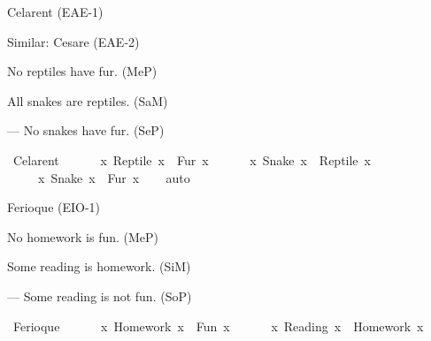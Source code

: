 \begin{isabellebody}
\begin{exercise}[subtitle=Silogizmi]
\begin{isamarkuptext}
Celarent (EAE-1)%
\end{isamarkuptext}\isamarkuptrue%
%
\begin{isamarkuptext}%
Similar: Cesare (EAE-2)%
\end{isamarkuptext}\isamarkuptrue%
%
\begin{isamarkuptext}%
No reptiles have fur. (MeP)%
\end{isamarkuptext}\isamarkuptrue%
%
\begin{isamarkuptext}%
All snakes are reptiles. (SaM)%
\end{isamarkuptext}\isamarkuptrue%
%
\begin{isamarkuptext}%
— No snakes have fur. (SeP)%
\end{isamarkuptext}\isamarkuptrue%
\isamarkupfalse%
\ Celarent{\isacharcolon}{\kern0pt}\ {\isachardoublequoteopen}\isanewline
\ \ \ \ {\isacharparenleft}{\kern0pt}{\isasymnexists}\ x{\isachardot}{\kern0pt}\ Reptile\ x\ {\isasymand}\ Fur\ x{\isacharparenright}{\kern0pt}\ {\isasymand}\isanewline
\ \ \ \ {\isacharparenleft}{\kern0pt}{\isasymforall}\ x{\isachardot}{\kern0pt}\ Snake\ x\ {\isasymlongrightarrow}\ Reptile\ x{\isacharparenright}{\kern0pt}\ {\isasymlongrightarrow}\isanewline
\ \ \ \ {\isacharparenleft}{\kern0pt}{\isasymnexists}\ x{\isachardot}{\kern0pt}\ Snake\ x\ {\isasymand}\ Fur\ x{\isacharparenright}{\kern0pt}{\isachardoublequoteclose}\isanewline
%
\isadelimproof
\ \ %
\endisadelimproof
%
\isatagproof
{}\isamarkupfalse%
\ auto%
\endisatagproof
{\isafoldproof}%
%
\isadelimproof
%
\endisadelimproof
%
\begin{isamarkuptext}%
Ferioque (EIO-1)%
\end{isamarkuptext}\isamarkuptrue%
%
\begin{isamarkuptext}%
No homework is fun. (MeP)%
\end{isamarkuptext}\isamarkuptrue%
%
\begin{isamarkuptext}%
Some reading is homework. (SiM)%
\end{isamarkuptext}\isamarkuptrue%
%
\begin{isamarkuptext}%
— Some reading is not fun. (SoP)%
\end{isamarkuptext}\isamarkuptrue%
\isamarkupfalse%
\ Ferioque{\isacharcolon}{\kern0pt}\ {\isachardoublequoteopen}\isanewline
\ \ \ \ {\isacharparenleft}{\kern0pt}{\isasymnexists}\ x{\isachardot}{\kern0pt}\ Homework\ x\ {\isasymand}\ Fun\ x{\isacharparenright}{\kern0pt}\ {\isasymand}\isanewline
\ \ \ \ {\isacharparenleft}{\kern0pt}{\isasymexists}\ x{\isachardot}{\kern0pt}\ Reading\ x\ {\isasymand}\ Homework\ x{\isacharparenright}{\kern0pt}\ {\isasymlongrightarrow}\isanewline

\end{exercise}
\end{isabellebody}
